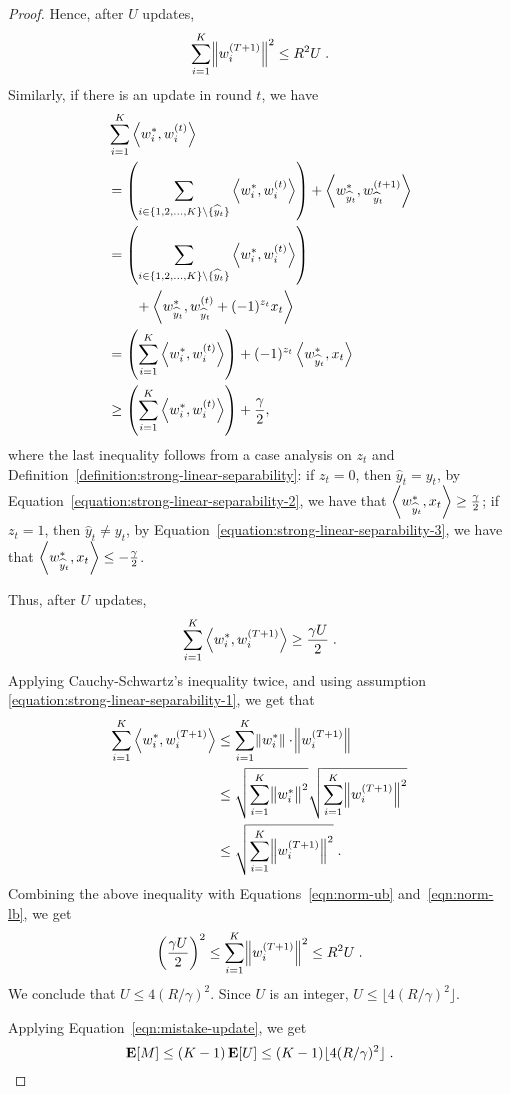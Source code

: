 \begin{proof}
Hence, after $U$ updates,
\begin{equation}
\sum_{i=1}^K \norm{w_i^{(T+1)}}^2 \le R^2 U \; .
\label{eqn:norm-ub}
\end{equation}
Similarly, if there is an update in round $t$, we have
\begingroup
\allowdisplaybreaks
\begin{align*}
& \sum_{i=1}^K \left\langle w_i^*, w_i^{(t)} \right\rangle \\
& = \left( \sum_{i \in \{1,2,\dots,K\} \setminus \{\widehat y_t\}} \left\langle w_i^*, w_i^{(t)} \right\rangle \right) + \left\langle w_{\widehat y_t}^*, w_{\widehat y_t}^{(t+1)} \right\rangle \\
& = \left( \sum_{i \in \{1,2,\dots,K\} \setminus \{\widehat y_t\}} \left\langle w_i^*, w_i^{(t)} \right\rangle \right) \\
& \qquad + \left\langle w_{\widehat y_t}^*, w_{\widehat y_t}^{(t)} + (-1)^{z_t} x_t \right\rangle \\
& = \left( \sum_{i=1}^K \left\langle w_i^*, w_i^{(t)} \right\rangle \right) + (-1)^{z_t} \left\langle w_{\widehat y_t}^*, x_t \right\rangle \\
& \ge \left( \sum_{i=1}^K \left\langle w_i^*, w_i^{(t)} \right\rangle \right) + \frac \gamma 2,
\end{align*}
\endgroup
where the last inequality follows from a case analysis on $z_t$ and
Definition~\ref{definition:strong-linear-separability}: if $z_t = 0$, then
$\widehat y_t = y_t$, by Equation~\eqref{equation:strong-linear-separability-2},
we have that $\left\langle w_{\widehat y_t}^*, x_t \right\rangle \geq \frac \gamma 2$; if $z_t = 1$,
then $\widehat y_t \neq y_t$, by
Equation~\eqref{equation:strong-linear-separability-3}, we have that
$\left\langle w_{\widehat y_t}^*, x_t \right\rangle \le -\frac \gamma 2$.

Thus, after $U$ updates,
\begin{equation}
\sum_{i=1}^K \left\langle w_i^*, w_i^{(T+1)} \right\rangle \ge \frac {\gamma U} 2 \; .
\label{eqn:norm-lb}
\end{equation}
Applying Cauchy-Schwartz's inequality twice, and using assumption
\eqref{equation:strong-linear-separability-1}, we get that
\begin{align*}
\sum_{i=1}^K \left\langle w_i^*, w_i^{(T+1)} \right\rangle
& \le \sum_{i=1}^K \norm{w_i^*} \cdot \norm{w_i^{(T+1)}} \\
& \le \sqrt{\sum_{i=1}^K \norm{w_i^*}^2} \sqrt{\sum_{i=1}^K \norm{w_i^{(T+1)}}^2} \\
& \le \sqrt{\sum_{i=1}^K \norm{w_i^{(T+1)}}^2} \; .
\end{align*}
Combining the above inequality with Equations~\eqref{eqn:norm-ub} and~\eqref{eqn:norm-lb}, we get
$$
\left(\frac{\gamma U}{2} \right)^2 \le \sum_{i=1}^K \norm{w_i^{(T+1)}}^2 \le R^2 U \; .
$$
We conclude that $U \le 4(R/\gamma)^2$. Since $U$ is an integer, $U \le \lfloor 4(R/\gamma)^2 \rfloor$.

Applying Equation~\eqref{eqn:mistake-update}, we get
$$
\operatorname*{\mathbf{E}}[M] \leq (K-1) \operatorname*{\mathbf{E}}[U] \leq (K-1) \lfloor 4(R/\gamma)^2 \rfloor \; . \qedhere
$$
\end{proof}

